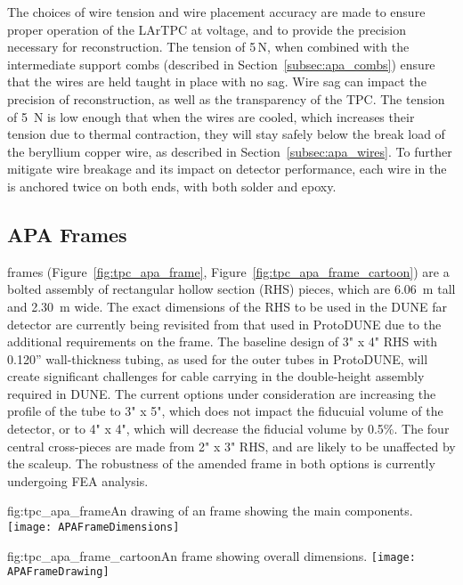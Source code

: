 The choices of wire tension and wire placement accuracy are made to ensure proper operation of the LArTPC at voltage, and to provide the precision necessary for reconstruction.  The tension of 5\,N, when combined with the intermediate support combs (described in Section~\ref{subsec:apa_combs}) ensure that the wires are held taught in place with no sag.  Wire sag can impact the precision of reconstruction, as well as the transparency of the TPC.  The tension of 5~N is low enough that when the wires are cooled, which increases their tension due to thermal contraction, they will stay safely below the break load of the beryllium copper wire, as described in Section~\ref{subsec:apa_wires}.  To further mitigate wire breakage and its impact on detector performance, each wire in the   is anchored twice on both ends, with both solder and epoxy.  


\subsection{APA Frames}
\label{sec:fdsp-apa-frames}

  frames (Figure~\ref{fig:tpc_apa_frame}, Figure~\ref{fig:tpc_apa_frame_cartoon}) are a bolted assembly of rectangular hollow section (RHS) pieces, which are \SI{6.06}{m} tall and \SI{2.30}{m} wide.  The exact dimensions of the RHS to be used in the DUNE far detector are currently being revisited from that used in ProtoDUNE due to the additional requirements on the frame.  The baseline design of 3" x 4" RHS with 0.120” wall-thickness tubing, as used for the outer tubes in ProtoDUNE, will create significant challenges for cable carrying in the double-height   assembly required in DUNE.  The current options under consideration are increasing the profile of the tube to 3" x 5", which does not impact the fiducuial volume of the detector, or to 4" x 4", which will decrease the fiducial volume by 0.5\%.  The four central cross-pieces are made from 2" x 3" RHS, and are likely to be unaffected by the scaleup. The robustness of the amended frame in both options is currently undergoing FEA analysis.  

\begin{dunefigure}{fig:tpc_apa_frame}{An drawing of an   frame showing the main components. }
\texttt{[image: APAFrameDimensions]} 
\end{dunefigure}

\begin{dunefigure}{fig:tpc_apa_frame_cartoon}{An   frame showing overall dimensions.}
\texttt{[image: APAFrameDrawing]} 
\end{dunefigure}


